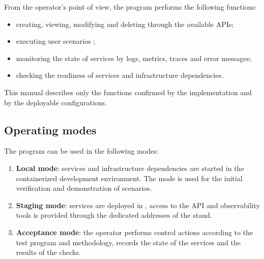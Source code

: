 \documentclass[12pt,a4paper]{extarticle}
\begin{document}
\begin{hseExample}
From the operator's point of view, the program performs the following functions:

\begin{itemize}[leftmargin=1.25cm]
    \item creating, viewing, modifying and deleting  through the available APIs;
    \item executing user scenarios ;
    \item monitoring the state of services by logs, metrics, traces and error messages;
    \item checking the readiness of services and infrastructure dependencies.
\end{itemize}

This manual describes only the functions confirmed by the implementation and by the deployable configurations.
\end{hseExample}

\subsection{Operating modes}

\begin{hseExample}
The program can be used in the following modes:

\begin{enumerate}[label=\arabic*), leftmargin=1.25cm]
    \item \textbf{Local mode}: services and infrastructure dependencies are started in the containerized development environment. The mode is used for the initial verification and demonstration of scenarios.
    \item \textbf{Staging mode}: services are deployed in , access to the API and observability tools is provided through the dedicated addresses of the stand.
    \item \textbf{Acceptance mode}: the operator performs control actions according to the test program and methodology, records the state of the services and the results of the checks.
\end{enumerate}
\end{hseExample}
\end{document}

